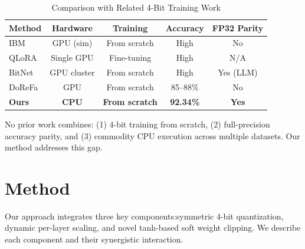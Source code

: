 \documentclass[conference]{IEEEtran}
\begin{document}
\begin{table}[t]
\centering
\caption{Comparison with Related 4-Bit Training Work}
\label{tab:related_work}
\begin{tabular}{@{}lcccc@{}}
\toprule
\textbf{Method} & \textbf{Hardware} & \textbf{Training} & \textbf{Accuracy} & \textbf{FP32 Parity} \\
\midrule
IBM \cite{sun2020ultra} & GPU (sim) & From scratch & High & No \\
QLoRA \cite{dettmers2023qlora} & Single GPU & Fine-tuning & High & N/A \\
BitNet \cite{wang2023bitnet} & GPU cluster & From scratch & High & Yes (LLM) \\
DoReFa \cite{zhou2016dorefa} & GPU & From scratch & 85--88\% & No \\
\textbf{Ours} & \textbf{CPU} & \textbf{From scratch} & \textbf{92.34\%} & \textbf{Yes} \\
\bottomrule
\end{tabular}
\end{table}

No prior work combines: (1) 4-bit training from scratch, (2) full-precision accuracy parity, and (3) commodity CPU execution across multiple datasets. Our method addresses this gap.

\section{Method}

Our approach integrates three key components:symmetric 4-bit quantization, dynamic per-layer scaling, and novel tanh-based soft weight clipping. We describe each component and their synergistic interaction.
\end{document}
